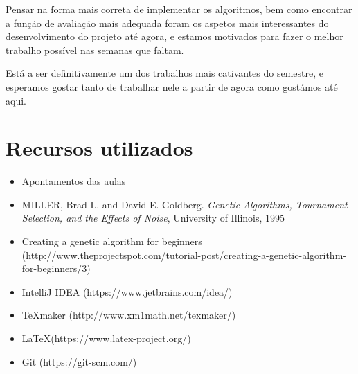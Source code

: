 \documentclass[11pt,a4paper,reqno]{article}
\numberwithin{equation}{section}
\begin{document}
Pensar na forma mais correta de implementar os algoritmos, bem como encontrar a função de avaliação mais adequada foram os aspetos mais interessantes do desenvolvimento do projeto até agora, e estamos motivados para fazer o melhor trabalho possível nas semanas que faltam.

Está a ser definitivamente um dos trabalhos mais cativantes do semestre, e esperamos gostar tanto de trabalhar nele a partir de agora como gostámos até aqui.


\newpage

\section{Recursos utilizados}

\begin{itemize}
\item Apontamentos das aulas
\item MILLER, Brad L. and David E. Goldberg. \textit{Genetic Algorithms, Tournament Selection, and the Effects of Noise}, University of Illinois, 1995\item Creating a genetic algorithm for beginners (http://www.theprojectspot.com/tutorial-post/creating-a-genetic-algorithm-for-beginners/3)
\item IntelliJ IDEA (https://www.jetbrains.com/idea/)
\item TeXmaker (http://www.xm1math.net/texmaker/)
\item LaTeX(https://www.latex-project.org/)
\item Git (https://git-scm.com/)

\end{itemize}
\end{document}
